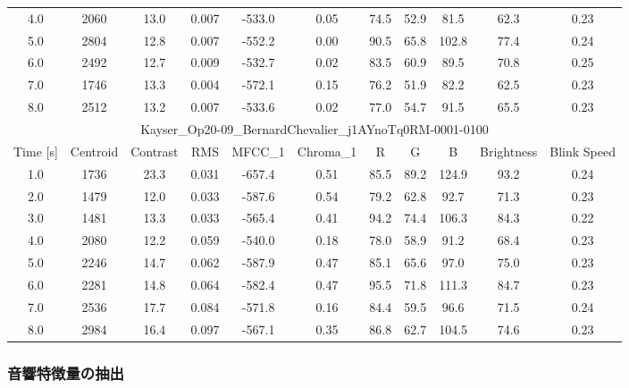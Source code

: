 \begin{table}[t]
\begin{tabular}{c|cccccccccc}
		4.0      & 2060       & 13.0        & 0.007 & -533.0  & 0.05      & 74.5  & 52.9  & 81.5  & 62.3  & 0.23 \\
		5.0      & 2804       & 12.8        & 0.007 & -552.2  & 0.00      & 90.5  & 65.8  & 102.8 & 77.4  & 0.24 \\
		6.0      & 2492       & 12.7        & 0.009 & -532.7  & 0.02      & 83.5  & 60.9  & 89.5  & 70.8  & 0.25 \\
		7.0      & 1746       & 13.3        & 0.004 & -572.1  & 0.15      & 76.2  & 51.9  & 82.2  & 62.5  & 0.23 \\
		8.0      & 2512       & 13.2        & 0.007 & -533.6  & 0.02      & 77.0  & 54.7  & 91.5  & 65.5  & 0.23 \\
		\hline
		\multicolumn{11}{c}{Kayser\_Op20-09\_BernardChevalier\_j1AYnoTq0RM-0001-0100}                            \\
		\hline
		\hline
		Time [s] & Centroid   & Contrast    & RMS   & MFCC\_1 & Chroma\_1 & R     & G     & B
		         & Brightness & Blink Speed                                                                      \\
		\hline
		1.0      & 1736       & 23.3        & 0.031 & -657.4  & 0.51      & 85.5  & 89.2  & 124.9 & 93.2  & 0.24 \\
		2.0      & 1479       & 12.0        & 0.033 & -587.6  & 0.54      & 79.2  & 62.8  & 92.7  & 71.3  & 0.23 \\
		3.0      & 1481       & 13.3        & 0.033 & -565.4  & 0.41      & 94.2  & 74.4  & 106.3 & 84.3  & 0.22 \\
		4.0      & 2080       & 12.2        & 0.059 & -540.0  & 0.18      & 78.0  & 58.9  & 91.2  & 68.4  & 0.23 \\
		5.0      & 2246       & 14.7        & 0.062 & -587.9  & 0.47      & 85.1  & 65.6  & 97.0  & 75.0  & 0.23 \\
		6.0      & 2281       & 14.8        & 0.064 & -582.4  & 0.47      & 95.5  & 71.8  & 111.3 & 84.7  & 0.23 \\
		7.0      & 2536       & 17.7        & 0.084 & -571.8  & 0.16      & 84.4  & 59.5  & 96.6  & 71.5  & 0.24 \\
		8.0      & 2984       & 16.4        & 0.097 & -567.1  & 0.35      & 86.8  & 62.7  & 104.5 & 74.6  & 0.23 \\
		\hline
	\end{tabular}
\end{table}

\subsubsection{音響特徴量の抽出} \label{sec:otomidi}

